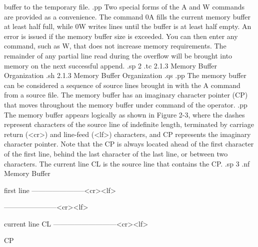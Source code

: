 buffer to the temporary file.  
.pp
Two special forms of the A and W commands 
are provided as a convenience.  The command 0A fills the current memory 
buffer at least half full, while 0W writes lines until the buffer is at least 
half empty.  An error is issued if the memory buffer size is exceeded.  
You can then enter any command, such as W, that does not increase 
memory requirements.  The remainder of any partial line read during the 
overflow will be brought into memory on the next successful append.
.sp 2
.tc         2.1.3  Memory Buffer Organization
.sh
2.1.3  Memory Buffer Organization
.qs
.pp
The memory buffer can be considered a sequence of source lines brought 
in with the A command from a source file.  The memory buffer has an imaginary 
character pointer (CP) that moves throughout the memory buffer 
under command of the operator.  
.pp
The memory buffer appears logically as shown 
in Figure 2-3, where the dashes represent characters of the source line of 
indefinite length, terminated by carriage return (<cr>) and line-feed (<lf>)
characters, and CP represents the imaginary character pointer.  
Note that the CP is always located ahead of the first character of the 
first line, behind the last character of the last line, or between two 
characters.  The current line CL is the source line that contains the CP.
.sp 3
.nf
                          Memory Buffer


      first line        -----------------------<cr><lf>


                        -----------------------<cr><lf>


      current line CL   ---------------------------<cr><lf>
                                   
                                      
                                    CP

